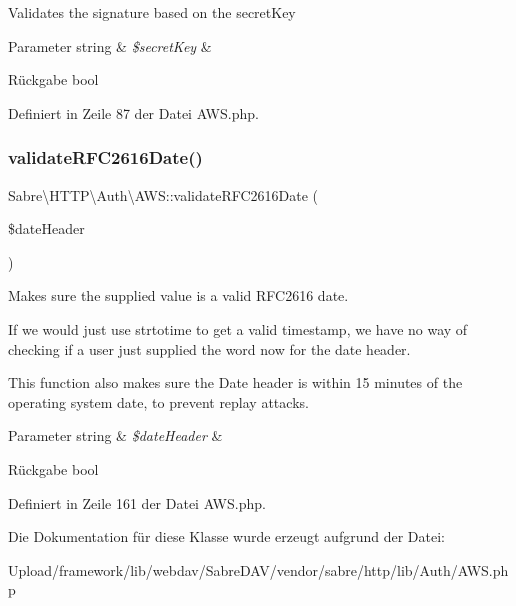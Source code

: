 Validates the signature based on the secret\+Key


\begin{DoxyParams}[1]{Parameter}
string & {\em \$secret\+Key} & \\
\hline
\end{DoxyParams}
\begin{DoxyReturn}{Rückgabe}
bool 
\end{DoxyReturn}


Definiert in Zeile 87 der Datei A\+W\+S.\+php.

\mbox{\label{class_sabre_1_1_h_t_t_p_1_1_auth_1_1_a_w_s_ada084fb0a402eee92b1a6e028b11c154}} 
\subsubsection{\texorpdfstring{validate\+R\+F\+C2616\+Date()}{validateRFC2616Date()}}
{\footnotesize\ttfamily Sabre\textbackslash{}\+H\+T\+T\+P\textbackslash{}\+Auth\textbackslash{}\+A\+W\+S\+::validate\+R\+F\+C2616\+Date (\begin{DoxyParamCaption}\item[{}]{\$date\+Header }\end{DoxyParamCaption})\hspace{0.3cm}{\ttfamily [protected]}}

Makes sure the supplied value is a valid R\+F\+C2616 date.

If we would just use strtotime to get a valid timestamp, we have no way of checking if a user just supplied the word \textquotesingle{}now\textquotesingle{} for the date header.

This function also makes sure the Date header is within 15 minutes of the operating system date, to prevent replay attacks.


\begin{DoxyParams}[1]{Parameter}
string & {\em \$date\+Header} & \\
\hline
\end{DoxyParams}
\begin{DoxyReturn}{Rückgabe}
bool 
\end{DoxyReturn}


Definiert in Zeile 161 der Datei A\+W\+S.\+php.



Die Dokumentation für diese Klasse wurde erzeugt aufgrund der Datei\+:\begin{DoxyCompactItemize}
\item 
Upload/framework/lib/webdav/\+Sabre\+D\+A\+V/vendor/sabre/http/lib/\+Auth/A\+W\+S.\+php\end{DoxyCompactItemize}
